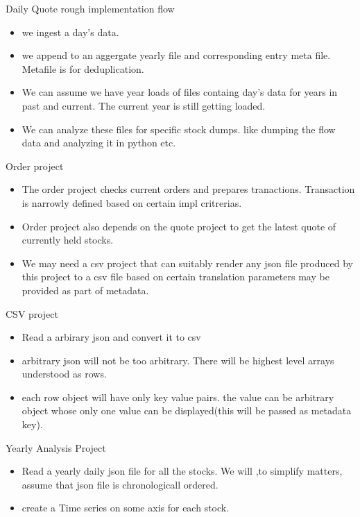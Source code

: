 \documentclass{beamer}
\begin{document}
\begin{frame}{Daily Quote rough implementation flow}
	\begin{itemize}
		\item we ingest a day's data.
		\item we append to an aggergate yearly file and corresponding entry meta file. Metafile is for deduplication.
		\item We can assume we have year loads of files containg day's data for years in past and current. The current year is still getting loaded.

		\item We can analyze these files for specific stock dumps. like dumping the flow data and analyzing it in python etc.
	\end{itemize}
\end{frame}


\begin{frame}{Order project}
	\begin{itemize}
		\item The order project checks current orders and prepares tranactions. Transaction is narrowly defined based on certain impl critrerias.
		\item Order project also depends on the quote project to get the latest quote of currently held stocks.
		\item We may need a csv project that can suitably render any json file produced by this project to a csv file based on  certain translation parameters may be provided as part of metadata.
		
	\end{itemize}
\end{frame}

\begin{frame}{CSV project}
	\begin{itemize}
		\item Read a arbirary json and convert it to csv
		\item arbitrary json will not be too arbitrary. There will be highest level arrays understood as rows.
		\item each row object will have only key value pairs. the value can be arbitrary object whose only one value can be displayed(this will be passed as metadata key).
	\end{itemize}
\end{frame}

\begin{frame}{Yearly Analysis Project}
	\begin{itemize}
		\item Read a yearly daily json file for all the stocks. We will ,to simplify matters, assume that json file is chronologicall ordered.
		\item create a Time series  on some axis for each stock.
	\end{itemize}
\end{frame}
\end{document}
